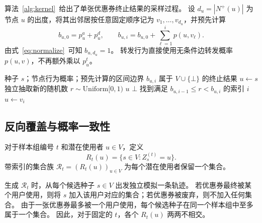 算法~\ref{alg:kernel}~给出了单张优惠券终止结果的采样过程。
设 $d_u=|N^+(u)|$ 为节点 $u$ 的出度，将其出邻居按任意固定顺序记为
$v_1,\ldots,v_{d_u}$，并预先计算
\[
 b_{u,0}=p_u^a+p_u^d,\qquad
 b_{u,i}=b_{u,0}+\sum_{\ell=1}^{i}p(u,v_\ell).
\]
由式~\eqref{eq:normalize}~可知 $b_{u,d_u}=1$。
转发行为直接使用无条件边转发概率 $p(u,v)$，不再额外乘以 $p_u^t$。

\begin{algorithm}[t]
\caption{单张优惠券的终止结果采样：\textsc{SampleTerminalConsumer}$(s)$}
\label{alg:kernel}
\begin{algorithmic}[1]
\Require 种子 $s$；节点行为概率；预先计算的区间边界 $b_{u,i}$
\Ensure 属于 $V\cup\{\bot\}$ 的终止结果
\State $u\gets s$
  \State 独立抽取新的随机数 $r\sim\mathrm{Uniform}[0,1)$
    \State \Return $u$
    \State \Return $\bot$
  \Else
    \State 找到满足 $b_{u,i-1}\le r<b_{u,i}$ 的索引 $i$
    \State $u\gets v_i$
  \EndIf
\EndWhile
\end{algorithmic}
\end{algorithm}

\subsection{反向覆盖与概率一致性}
\label{sec:reverse-coverage}

\begin{definition}[倒排覆盖集合]
对于样本组编号 $t$ 和潜在使用者 $u\in V$，定义
\begin{equation}
\label{eq:reverse-set-def}
 R_t(u)=\{s\in V:Z_s^{(t)}=u\}.
\end{equation}
带索引的集合族 $\mathcal R_t=(R_t(u))_{u\in V}$ 为每个潜在使用者保留一个集合。
\end{definition}

生成 $\mathcal R_t$ 时，从每个候选种子 $s\in V$ 出发独立模拟一条轨迹。
若优惠券最终被某个用户使用，则将 $s$ 加入该用户对应的集合；若优惠券被废弃，则不加入任何集合。
由于一张优惠券最多被一个用户使用，每个候选种子在同一个样本组中至多属于一个集合。
因此，对于固定的 $t$，各个 $R_t(u)$ 两两不相交。

